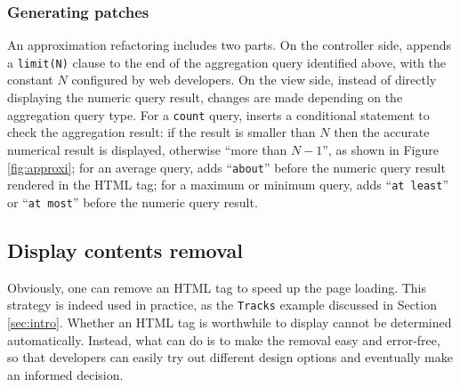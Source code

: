 \subsubsection{Generating patches}
An approximation refactoring includes two parts. 
On the controller side, \Tool appends a {\tt limit(N)} clause to the end of the
aggregation query identified above, with the constant $N$ configured by 
web developers. On the view side, instead of directly displaying the
numeric query result, changes are made depending on the aggregation query type.
For a {\tt count} query, \Tool inserts a conditional statement to check the aggregation result: if the result is smaller than $N$ then the accurate numerical result is displayed, otherwise
``more than $N-1$'', as shown in Figure \ref{fig:approxi};
for an average query, \Tool adds ``{\tt about}'' before the numeric query
result rendered in the HTML tag; for a maximum or minimum query,
\Tool adds ``{\tt at least}'' or ``{\tt at most}'' before the numeric query
result.



\subsection{Display contents removal}

Obviously, one can remove an HTML tag to speed up the page loading. 
This strategy is indeed used in practice, as the {\tt Tracks} example discussed in
Section \ref{sec:intro}.
Whether an HTML tag is worthwhile to display cannot be determined automatically.
Instead, what \Tool can do is to make the removal easy and error-free, so that developers
can easily try out different design options and eventually make an informed decision.

 
